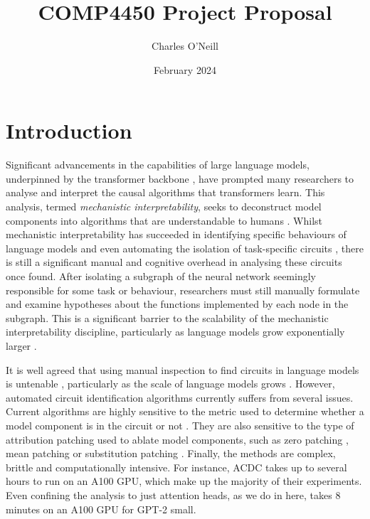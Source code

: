 \documentclass[11pt]{scrartcl}
\title{COMP4450 Project Proposal}
\author{Charles O'Neill}
\date{February 2024}
\begin{document}
\maketitle

\section{Introduction}

Significant advancements in the capabilities of large language models, underpinned by the transformer backbone \citep{vaswani2017attention}, have prompted many researchers to analyse and interpret the causal algorithms that transformers learn. This analysis, termed \textit{mechanistic interpretability}, seeks to deconstruct model components into algorithms that are understandable to humans \citep{olah2018building}. Whilst mechanistic interpretability has succeeded in identifying specific behaviours of language models and even automating the isolation of task-specific circuits \citep{conmy2024towards, cao2021low, michel2019sixteen}, there is still a significant manual and cognitive overhead in analysing these circuits once found. After isolating a subgraph of the neural network seemingly responsible for some task or behaviour, researchers must still manually formulate and examine hypotheses about the functions implemented by each node in the subgraph. This is a significant barrier to the scalability of the mechanistic interpretability discipline, particularly as language models grow exponentially larger \citep{kaplan2020scaling}.

It is well agreed that using manual inspection to find circuits in language models is untenable \citep{lieberum2023does}, particularly as the scale of language models grows \citep{he2024dictionary}. However, automated circuit identification algorithms currently suffers from several issues. Current algorithms are highly sensitive to the metric used to determine whether a model component is in the circuit or not \citep{conmy2024towards}. They are also sensitive to the type of attribution patching used to ablate model components, such as zero patching \citep{olsson2022context}, mean patching \citep{wang2022interpretability} or substitution patching \citep{geiger2021causal}. Finally, the methods are complex, brittle and computationally intensive. For instance, ACDC \citep{conmy2024towards} takes up to several hours to run on an A100 GPU, which make up the majority of their experiments. Even confining the analysis to just attention heads, as we do in here, takes 8 minutes on an A100 GPU for GPT-2 small.
\end{document}
